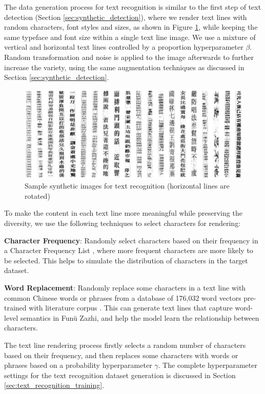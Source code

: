 \documentclass[12pt,twoside]{report}
\begin{document}
The data generation process for text recognition is similar to the first step of text detection (Section \ref{sec:synthetic_detection}), where we render text lines with random characters, font styles and sizes, as shown in Figure \ref{fig:synthetic_rec}, while keeping the same typeface and font size within a single text line image. We use a mixture of vertical and horizontal text lines controlled by a proportion hyperparameter $\beta$. Random transformation and noise is applied to the image afterwards to further increase the variety, using the same augmentation techniques as discussed in Section \ref{sec:synthetic_detection}.

\begin{figure}[htbp]
    \centering
    \includegraphics[width=\textwidth]{./figures/synthetic_rec.jpeg}
    \caption{Sample synthetic images for text recognition (horizontal lines are rotated)}
    \label{fig:synthetic_rec}
\end{figure}

To make the content in each text line more meaningful while preserving the diversity, we use the following techniques to select characters for rendering:

\textbf{Character Frequency}: Randomly select characters based on their frequency in a Character Frequency List \cite{charlist}, where more frequent characters are more likely to be selected. This helps to simulate the distribution of characters in the target dataset.

\textbf{Word Replacement}: Randomly replace some characters in a text line with common Chinese words or phrases from a database of 176,032 word vectors pre-trained with literature corpus \cite{wordlist}. This can generate text lines that capture word-level semantics in Funü Zazhi, and help the model learn the relationship between characters.

The text line rendering process firstly selects a random number of characters based on their frequency, and then replaces some characters with words or phrases based on a probability hyperparameter $\gamma$. The complete hyperparameter settings for the text recognition dataset generation is discussed in Section \ref{sec:text_recognition_training}.
\end{document}
